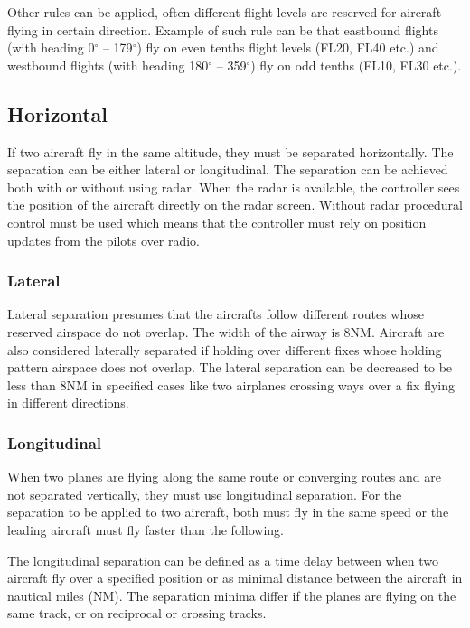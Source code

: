 Other rules can be applied, often different flight levels are reserved for aircraft flying in certain direction. Example of such rule can be that eastbound flights (with heading 0$^{\circ}$ – 179$^{\circ}$) fly on even tenths flight levels (FL20, FL40 etc.) and westbound flights (with heading 180$^{\circ}$ – 359$^{\circ}$) fly on odd tenths (FL10, FL30 etc.).

\subsection{Horizontal}

If two aircraft fly in the same altitude, they must be separated horizontally. The separation can be either lateral or longitudinal. The separation can be achieved both with or without using radar. When the radar is available, the controller sees the position of the aircraft directly on the radar screen. Without radar procedural control must be used which means that the controller must rely on position updates from the pilots over radio.

\subsubsection{Lateral}

Lateral separation presumes that the aircrafts follow different routes whose reserved airspace do not overlap. \cite[Chapter 7]{nolan} The width of the airway is 8NM. Aircraft are also considered laterally separated if holding over different fixes whose holding pattern airspace does not overlap. The lateral separation can be decreased to be less than 8NM in specified cases like two airplanes crossing ways over a fix flying in different directions.

\subsubsection{Longitudinal}

When two planes are flying along the same route or converging routes and are not separated vertically, they must use longitudinal separation. For the separation to be applied to two aircraft, both must fly in the same speed or the leading aircraft must fly faster than the following.

The longitudinal separation can be defined as a time delay between when two aircraft fly over a specified position or as minimal distance between the aircraft in nautical miles (NM). The separation minima differ if the planes are flying on the same track, or on reciprocal or crossing tracks.

